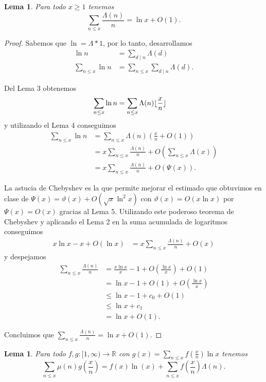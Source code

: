 \documentclass{article}
\DeclarePairedDelimiter\floor{\lfloor}{\rfloor}
\newtheorem{lemma}[theorem]{Lema}
\theoremstyle{definition}
\theoremstyle{remark}
\newcommand{\BR}{\mathbb R}
\begin{document}
\begin{lemma}
Para todo $x \geq 1$ tenemos
$$\sum_{n \leq x} \frac{\Lambda(n)}{n} = \ln x + O(1).$$
\end{lemma}

\begin{proof}
Sabemos que $\ln = \Lambda * 1$, por lo tanto, desarrollamos
\begin{align*}
\ln n &= \sum_{d \mid n} \Lambda(d) \\
\sum_{n \leq x} \ln n &= \sum_{n \leq x} \sum_{d \mid n} \Lambda(d).
\end{align*}

Del Lema 3 obtenemos
\begin{align*}
\sum_{n \leq x} \ln n &= \sum_{n \leq x} \Lambda(n) \floor{\frac{x}{n}}
\end{align*}
y utilizando el Lema 4 conseguimos
\begin{align*}
\sum_{n \leq x} \ln n &= \sum_{n \leq x} \Lambda(n) \left(\frac{x}{n} + O(1)\right) \\
&= x \sum_{n \leq x} \frac{\Lambda(n)}{n} + O\left(\sum_{n \leq x} \Lambda(x) \right) \\
&= x \sum_{n \leq x} \frac{\Lambda(n)}{n} + O(\Psi(x)).
\end{align*}

La astucia de Chebyshev es la que permite mejorar el estimado que obtuvimos en clase de 
$\Psi(x) = \vartheta(x) + O(\sqrt{x} \ln^2 x)$ con $\vartheta(x) = O(x \ln x)$ 
por $\Psi(x) = O(x)$ gracias al Lema 5.
Utilizando este poderoso teorema de Chebyshev y aplicando el Lema 2 en la suma acumulada de logaritmos conseguimos
\begin{align*}
x\ln x - x + O(\ln x) &= x \sum_{n \leq x} \frac{\Lambda(n)}{n} + O(x)
\end{align*}
y despejamos
\begin{align*}
\sum_{n \leq x} \frac{\Lambda(n)}{n} &= \frac{x \ln x}{x} - 1 + O\left(\frac{\ln x}{x}\right) + O(1) \\
&= \ln x - 1 + O(1) + O\left(\frac{\ln x}{x}\right) \\
&\leq \ln x - 1 + c_0 + O(1) \\
&\leq \ln x + c_1 \\
&= \ln x + O(1).
\end{align*}

Concluimos que $\sum_{n \leq x} \frac{\Lambda(n)}{n} = \ln x + O(1)$.
\end{proof}

\begin{lemma}
Para todo $f, g : [1, \infty) \to \BR$ con $g(x) = \sum_{n \leq x} f\left(\frac{x}{n}\right) \ln x$ tenemos
$$\sum_{n \leq x} \mu(n) g\left(\frac{x}{n}\right) = f(x) \ln(x) + \sum_{n \leq x} f\left(\frac{x}{n}\right) \Lambda(n).$$
\end{lemma}
\end{document}
